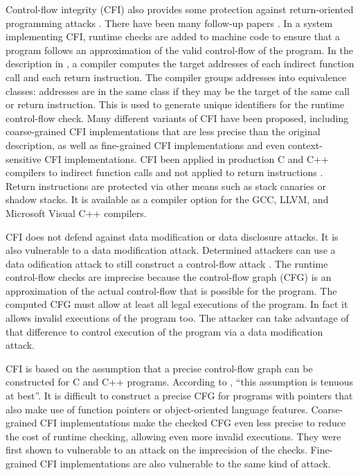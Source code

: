 Control-flow integrity (CFI) also provides some protection
against return-oriented programming attacks \cite{Abadi2005}.  There
have been many follow-up papers \cite{Akritidis2008, 
Erlingsson2006, Hawkins2016, Li2010, Li2011, Mashtizadeh2015,
NiuCCS2014,NiuPLDI2014,Niu2015, Sadeghi2015, Tice2014, 
vanderVeen2015, Wang2010,Wang2015, Zeng2011, ZhangSP2013,ZhangSEC2013,Zhang2015}.
In a system implementing CFI, runtime checks are added to machine code to ensure
that a program follows an approximation of the valid control-flow of the program. 
In the description in \cite{Abadi2005}, a compiler computes the target addresses of each 
indirect  function call and each return instruction.  The
compiler groups addresses into equivalence classes: addresses are in the same 
class if they may be the target of the same call or return instruction.  This is
used to generate unique identifiers for the runtime control-flow check. 
Many different variants of CFI have been proposed, including coarse-grained CFI
implementations that are less precise than the original description, as well
as fine-grained CFI implementations and even context-sensitive CFI implementations.
CFI been applied in production C and C++ compilers to indirect function
calls and not applied to return instructions
\cite{GCCCFG2016,LLVMCFG2016,MicrosoftCFG2016, Tice2014}.   Return instructions
are protected via other means such as stack canaries or shadow stacks.  It 
is available as a compiler option for the GCC, LLVM, and Microsoft Visual C++
compilers.

CFI does not defend against data modification or data disclosure attacks. 
It is also vulnerable to a data modification attack.  Determined attackers can
use a data odification attack to still construct a control-flow attack
\cite{Carlini2015, Conti2015, Evans2015, Goktas2014}.
The runtime control-flow checks are imprecise because the control-flow graph (CFG)
is an approximation of the actual control-flow that is possible for
the program.  The computed CFG must allow at least all legal executions of the
program. In fact it allows invalid executions of the program too.  The
attacker can take advantage of that difference to control execution of the program
via a data modification attack.

CFI is based on the assumption that a precise control-flow graph can be
constructed for C and C++ programs.  According to \cite{Evans2015},
``this assumption is tenuous at best''.  It is difficult to construct
a precise CFG for programs with pointers that also make use of function pointers
or object-oriented language features.  Coarse-grained CFI implementations make the
checked CFG even less precise to reduce  the cost of runtime checking, allowing even 
more invalid executions.  They were  first shown to vulnerable to an attack on the
imprecision of the checks.  Fine-grained CFI implementations are also vulnerable
to the same kind of attack.   

